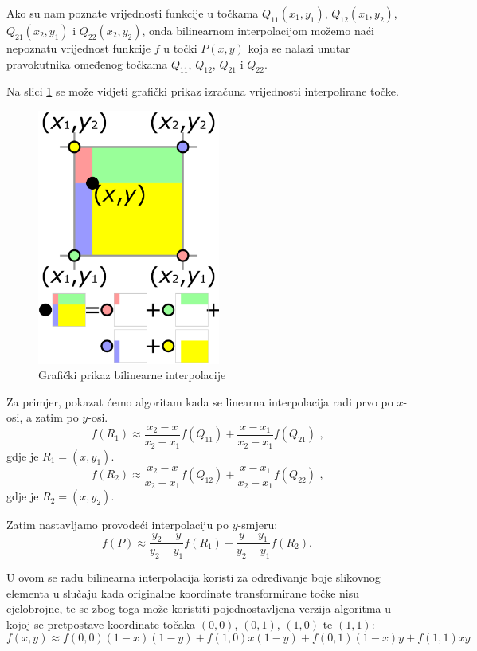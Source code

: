 Ako su nam poznate vrijednosti funkcije u točkama $Q_{11} (x_1, y_1)$, $Q_{12} (x_1, y_2)$, $Q_{21}  (x_2, y_1)$ i $Q_{22} (x_2, y_2)$, onda bilinearnom interpolacijom možemo naći nepoznatu vrijednost funkcije $f$ u točki $P (x, y)$ koja se nalazi unutar pravokutnika omeđenog točkama $Q_{11}$, $Q_{12}$, $Q_{21}$ i $Q_{22}$.

Na slici \ref{fig:bilintPrikaz} se može vidjeti grafički prikaz izračuna vrijednosti interpolirane točke.

\begin{figure}[ht]
\centering
\includegraphics[width=6cm]{figures/bilint_visualization.png}
\caption{Grafički prikaz bilinearne interpolacije}
\label{fig:bilintPrikaz}
\end{figure}

Za primjer, pokazat ćemo algoritam kada se linearna interpolacija radi prvo po $x$-osi, a zatim po $y$-osi.
\begin{equation}
f(R_1) \approx \frac{x_2 - x}{x_2 - x_1} f(Q_{11}) + \frac{x - x_1}{x_2 - x_1} f(Q_{21})\text{ ,}
\end{equation}
gdje je  $R_1 = (x, y_1)$.
\begin{equation}
f(R_2) \approx \frac{x_2 - x}{x_2 - x_1} f(Q_{12}) + \frac{x - x_1}{x_2 - x_1} f(Q_{22})\text{ ,}
\end{equation}
gdje je  $R_2 = (x, y_2)$.

Zatim nastavljamo provodeći interpolaciju po $y$-smjeru:
\begin{equation}
f(P) \approx \frac{y_2 - y}{y_2 - y_1} f(R_1) + \frac{y - y_1}{y_2 - y_1} f(R_2).
\end{equation}

U ovom se radu bilinearna interpolacija koristi za određivanje boje slikovnog elementa  u slučaju kada originalne koordinate transformirane točke nisu cjelobrojne, te se zbog toga može koristiti pojednostavljena verzija algoritma u kojoj se pretpostave koordinate točaka $(0,0)$, $(0, 1)$, $(1, 0)$ te $(1, 1)$:
\begin{equation}
\label{eq:interpolationSImple}
f(x, y) \approx f(0, 0)(1 - x)(1 -  y) + f(1, 0) x (1 - y) + f(0, 1) (1 - x) y + f(1, 1) x y
\end{equation}


